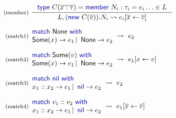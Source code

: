 \documentclass[10pt,preprint,blind,clearpagebib]{sigplanconf}
\newcommand{\kvd}[1]{\textnormal{\textcolor{kvdclr}{\sffamily #1}}}
\newcommand{\ident}[1]{\textnormal{\sffamily #1}}
\newcommand{\reduce}{\rightsquigarrow}
\begin{document}

\begin{figure}
\noindent
\begin{equation*}
\begin{array}{rl}
 \textnormal{\footnotesize{(member)}}&
 \hspace{-0.6em}
 \inference
 { \kvd{type}~C(\overline{x:\tau})= \kvd{member}~N_i : \tau_i = e_i \ldots \in L }
 { L, (\kvd{new}~C(\overline{v})).N_i \reduce e_i[\overline{x} \leftarrow \overline{v}] }\\
 \\[-0.2em]
 \textnormal{\footnotesize{(match1)}}&
 \hspace{-1em}
 \begin{array}{l}
  \kvd{match}~\ident{None}~\kvd{with} \\
  \ident{Some}(x) \rightarrow e_1 \,|\, \ident{None} \rightarrow e_2
 \end{array} \hspace{-0.5em} ~\reduce~ e_2 \\
 \\[-0.2em]
 \textnormal{\footnotesize{(match2)}}&
 \hspace{-1em}
 \begin{array}{l}
    \kvd{match}~\ident{Some}(v)~\kvd{with} \\
    \ident{Some}(x) \rightarrow e_1 \,|\, \ident{None} \rightarrow e_2
 \end{array} \hspace{-0.5em} ~\reduce~ e_1[x\leftarrow v]\\
 \\[-0.2em]
 \textnormal{\footnotesize{(match3)}}&
 \hspace{-1em}
 \begin{array}{l}
  \kvd{match}~\kvd{nil}~\kvd{with} \\[0em]
  x_1::x_2 \rightarrow e_1 \,|\, \kvd{nil} \rightarrow e_2
 \end{array} \hspace{-0.5em} ~\reduce~ e_2\\
 \\[-0.2em]
 \textnormal{\footnotesize{(match4)}}&
 \hspace{-1em}
 \begin{array}{l}
  \kvd{match}~v_1::v_2~\kvd{with} \\[0em]
  x_1::x_2 \rightarrow e_1 \,|\, \kvd{nil} \rightarrow e_2
 \end{array} \hspace{-0.5em} ~\reduce~ e_1[\overline{x}\leftarrow\overline{v}] \\

\end{array}
\end{equation*}
\end{figure}
\end{document}
